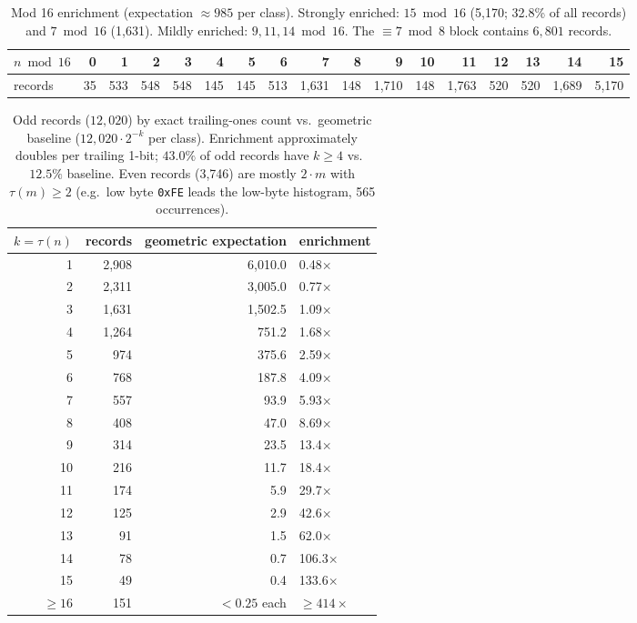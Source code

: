 \documentclass[11pt]{article}
\theoremstyle{remark}
\begin{document}
\begin{table}[t]
\centering\footnotesize\setlength{\tabcolsep}{3pt}
\begin{tabular}{@{}lrrrrrrrrrrrrrrrr@{}}
\toprule
$n \bmod 16$ & 0 & 1 & 2 & 3 & 4 & 5 & 6 & 7 & 8 & 9 & 10 & 11 & 12 & 13 & 14 & 15 \\
\midrule
records & 35 & 533 & 548 & 548 & 145 & 145 & 513 & 1{,}631 & 148 & 1{,}710 & 148 & 1{,}763 & 520 & 520 & 1{,}689 & 5{,}170 \\
\bottomrule
\end{tabular}
\caption{Mod 16 enrichment (expectation $\approx 985$ per class). Strongly
enriched: $15 \bmod 16$ (5{,}170; 32.8\% of all records) and $7 \bmod 16$
(1{,}631). Mildly enriched: $9, 11, 14 \bmod 16$. The $\equiv 7 \bmod 8$
block contains $6{,}801$ records.}
\label{tab:mod16}
\end{table}

\begin{table}[t]
\centering
\small
\begin{tabular}{@{}rrrl@{}}
\toprule
$k = \tau(n)$ & records & geometric expectation & enrichment \\
\midrule
1  & 2{,}908 & 6{,}010.0 & 0.48$\times$ \\
2  & 2{,}311 & 3{,}005.0 & 0.77$\times$ \\
3  & 1{,}631 & 1{,}502.5 & 1.09$\times$ \\
4  & 1{,}264 &   751.2 & 1.68$\times$ \\
5  &   974 &   375.6 & 2.59$\times$ \\
6  &   768 &   187.8 & 4.09$\times$ \\
7  &   557 &    93.9 & 5.93$\times$ \\
8  &   408 &    47.0 & 8.69$\times$ \\
9  &   314 &    23.5 & 13.4$\times$ \\
10 &   216 &    11.7 & 18.4$\times$ \\
11 &   174 &     5.9 & 29.7$\times$ \\
12 &   125 &     2.9 & 42.6$\times$ \\
13 &    91 &     1.5 & 62.0$\times$ \\
14 &    78 &     0.7 & 106.3$\times$ \\
15 &    49 &     0.4 & 133.6$\times$ \\
$\ge 16$ & 151 & $<0.25$ each & $\ge 414\times$ \\
\bottomrule
\end{tabular}
\caption{Odd records ($12{,}020$) by exact trailing-ones count vs.\
geometric baseline ($12{,}020 \cdot 2^{-k}$ per class). Enrichment
approximately doubles per trailing 1-bit; $43.0\%$ of odd records have
$k \ge 4$ vs.\ $12.5\%$ baseline. Even records (3{,}746) are mostly
$2 \cdot m$ with $\tau(m) \ge 2$ (e.g.\ low byte \texttt{0xFE} leads the
low-byte histogram, 565 occurrences).}
\label{tab:enrich}
\end{table}
\end{document}
